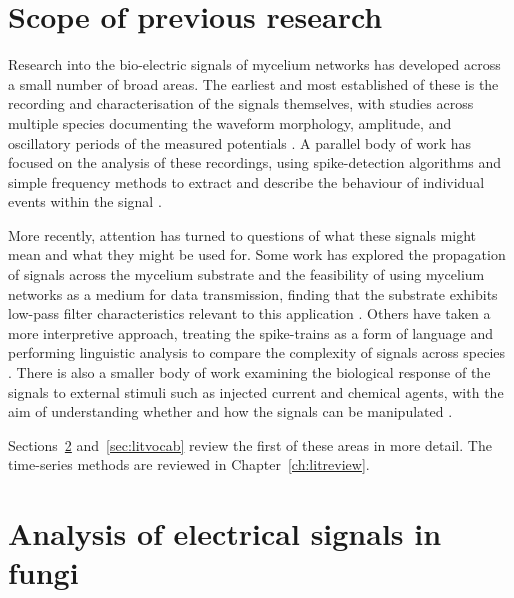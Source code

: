 \section{Scope of previous research}

Research into the bio-electric signals of mycelium networks has developed across a small number of broad areas. The earliest and most established of these is the recording and characterisation of the signals themselves, with studies across multiple species documenting the waveform morphology, amplitude, and oscillatory periods of the measured potentials \cite{slayman,adamatzky2023,dehshibi}. A parallel body of work has focused on the analysis of these recordings, using spike-detection algorithms and simple frequency methods to extract and describe the behaviour of individual events within the signal \cite{adamatzky2023,dehshibi,buffi}.

More recently, attention has turned to questions of what these signals might mean and what they might be used for. Some work has explored the propagation of signals across the mycelium substrate and the feasibility of using mycelium networks as a medium for data transmission, finding that the substrate exhibits low-pass filter characteristics relevant to this application \cite{mayne,phillips}. Others have taken a more interpretive approach, treating the spike-trains as a form of language and performing linguistic analysis to compare the complexity of signals across species \cite{adamatzky2022}. There is also a smaller body of work examining the biological response of the signals to external stimuli such as injected current and chemical agents, with the aim of understanding whether and how the signals can be manipulated \cite{buffi,olsson}.

Sections~\ref{sec:litfungi} and~\ref{sec:litvocab} review the first of these areas in more detail. The time-series methods are reviewed in Chapter~\ref{ch:litreview}.

\section{Analysis of electrical signals in fungi}
\label{sec:litfungi}

